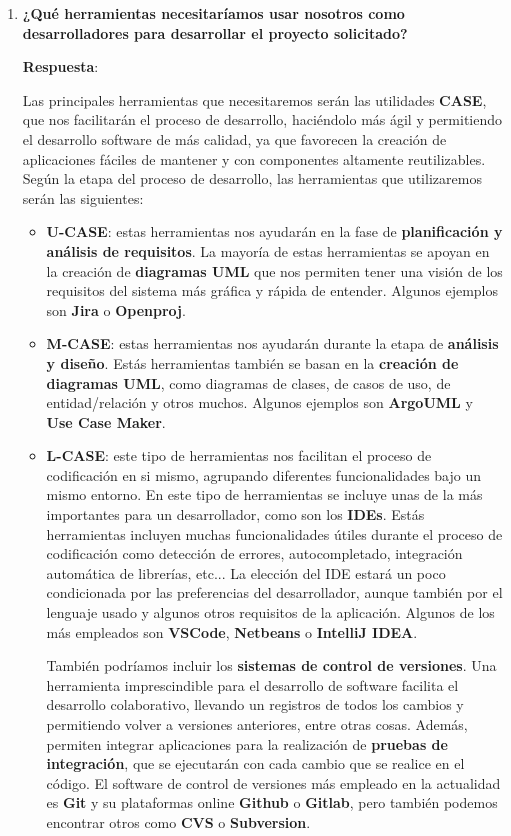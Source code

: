 \begin{enumerate}
     \item \textbf{¿Qué herramientas necesitaríamos usar nosotros como desarrolladores para desarrollar el proyecto solicitado?}

     \textbf{Respuesta}:

     Las principales herramientas que necesitaremos serán las utilidades \textbf{CASE}, que nos facilitarán el proceso de desarrollo, haciéndolo más ágil y permitiendo el desarrollo software de más calidad, ya que favorecen la creación de aplicaciones fáciles de mantener y con componentes altamente reutilizables. Según la etapa del proceso de desarrollo, las herramientas que utilizaremos serán las siguientes:

     \begin{itemize}
         \item \textbf{U-CASE}: estas herramientas nos ayudarán en la fase de \textbf{planificación y análisis de requisitos}. La mayoría de estas herramientas se apoyan en la creación de \textbf{diagramas UML} que nos permiten tener una visión de los requisitos del sistema más gráfica y rápida de entender. Algunos ejemplos son \textbf{Jira} o \textbf{Openproj}.

         \item \textbf{M-CASE}: estas herramientas nos ayudarán durante la etapa de \textbf{análisis y diseño}. Estás herramientas también se basan en la \textbf{creación de diagramas UML}, como diagramas de clases, de casos de uso, de entidad/relación y otros muchos. Algunos ejemplos son \textbf{ArgoUML} y \textbf{Use Case Maker}.

         \item \textbf{L-CASE}: este tipo de herramientas nos facilitan el proceso de codificación en si mismo, agrupando diferentes funcionalidades bajo un mismo entorno. En este tipo de herramientas se incluye unas de la más importantes para un desarrollador, como son los \textbf{IDEs}.  Estás herramientas incluyen muchas funcionalidades útiles durante el proceso de codificación como detección de errores, autocompletado, integración automática de librerías, etc... La elección del IDE estará un poco condicionada por las preferencias del desarrollador, aunque también por el lenguaje usado y algunos otros requisitos de la aplicación. Algunos de los más empleados son \textbf{VSCode}, \textbf{Netbeans} o \textbf{IntelliJ IDEA}.

         También podríamos incluir los \textbf{sistemas de control de versiones}. Una herramienta imprescindible para el desarrollo de software facilita el desarrollo colaborativo, llevando un registros de todos los cambios y permitiendo volver a versiones anteriores, entre otras cosas. Además, permiten integrar aplicaciones para la realización de \textbf{pruebas de integración}, que se ejecutarán con cada cambio que se realice en el código. El software de control de versiones más empleado en la actualidad es \textbf{Git} y su plataformas online \textbf{Github} o  \textbf{Gitlab}, pero también podemos encontrar otros como \textbf{CVS} o \textbf{Subversion}.
     \end{itemize}


\end{enumerate}
